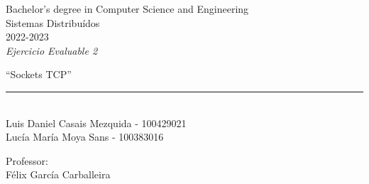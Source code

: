 \begin{titlepage}
    \begin{sffamily}
    \color{azulUC3M}
    \begin{center}
        \begin{figure}[H]
        \end{figure}
        \vspace{1.5cm}
        \begin{Large}
            Bachelor's degree in Computer Science and Engineering\\
            Sistemas Distribuídos\\
            2022-2023\\
            \vspace{2cm}
            \textsl{Ejercicio Evaluable 2}
            \bigskip

        \end{Large}
            {\Huge ``Sockets TCP''}\\
            \vspace*{0.5cm}
            \rule{10.5cm}{0.1mm}\\
            \vspace*{0.9cm}
            {\LARGE Luis Daniel Casais Mezquida - 100429021}\\
            \vspace*{0.2cm}
            {\LARGE Lucía María Moya Sans - 100383016}\\
            \vspace*{0.2cm}

            \vspace*{0.8cm}
        \begin{Large}
            Professor:\\
            Félix García Carballeira\\
        \end{Large}
    \end{center}
    \vfill

    \end{sffamily}
\end{titlepage}
